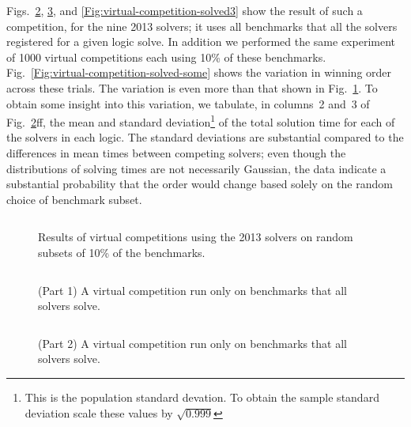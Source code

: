 \documentclass[smallcondensed]{svjour3}
\begin{document}
Figs.~\ref{Fig:virtual-competition-solved}, \ref{Fig:virtual-competition-solved2}, and \ref{Fig:virtual-competition-solved3} show the result of such a competition, for the nine 2013 solvers; it uses all benchmarks that all the solvers registered for a given logic solve. In addition we performed the same experiment of 1000 virtual competitions each using 10\% of these benchmarks.  Fig.~\ref{Fig:virtual-competition-solved-some} shows the variation in winning order across these trials. The variation is even more than that shown in Fig.~\ref{Fig:virtual-competition-some}. To obtain some insight into this variation, we tabulate, in columns~2 and~3 of Fig.~\ref{Fig:virtual-competition-solved}ff, the mean and standard deviation\footnote{This is the population standard devation. To obtain the sample standard deviation scale these values by $\sqrt{0.999}$ } of the total solution time for each of the solvers in each logic. The standard deviations are substantial compared to the differences in mean times between competing solvers; even though the distributions of solving times are not necessarily Gaussian, the data indicate a substantial probability that the order would change based solely on the random choice of benchmark subset.

\begin{figure}
\centering
\begin{tabular}{|lrr|rr|r|}
\hline

\end{tabular}
\caption{Results of virtual competitions using the 2013 solvers on random subsets of 10\% of the benchmarks.}
\label{Fig:virtual-competition-some}
\end{figure}

\begin{figure}
\centering
\begin{tabular}{|p{.01in}rrrl|}
\hline

\end{tabular}
\caption{(Part 1) A virtual competition run only on benchmarks that all solvers solve.}
\label{Fig:virtual-competition-solved}
\end{figure}

\begin{figure}
\centering
\begin{tabular}{|p{.01in}rrrl|}
\hline

\end{tabular}
\caption{(Part 2) A virtual competition run only on benchmarks that all solvers solve.}
\label{Fig:virtual-competition-solved2}
\end{figure}
\end{document}
